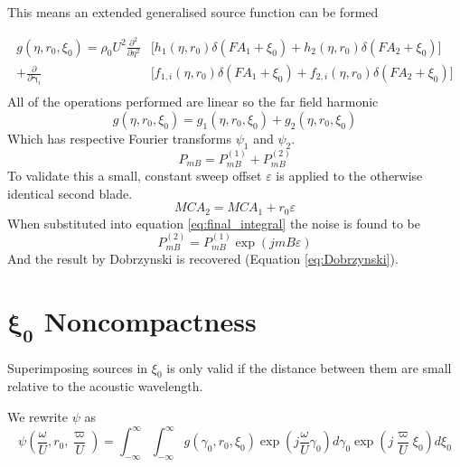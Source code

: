 \documentclass[8pt]{article}
\begin{document}
This means an extended generalised source function can be formed

\begin{equation}
    \begin{aligned}
        g(\eta, r_0, \xi_0) = \rho_0 U^2 \frac{\partial^2 }{\partial \eta^2} &\bigg[ h_1(\eta, r_0)\delta(FA_1 + \xi_0) + h_2(\eta, r_0) \delta(FA_2 + \xi_0)\bigg] \\
        + \frac{\partial }{\partial \boldsymbol{\gamma}_i} &\Big[ f_{1,i}(\eta, r_0) \delta(FA_1 + \xi_0) + f_{2,i}(\eta, r_0) \delta(FA_2 + \xi_0)\Big] \\
    \end{aligned}
    \label{eq:generalised_source_extended}
\end{equation}
All of the operations performed are linear so the far field harmonic
\begin{equation}
    g(\eta, r_0, \xi_0) = g_1(\eta, r_0, \xi_0) + g_2(\eta, r_0, \xi_0)
\end{equation}
Which has respective Fourier transforms $\psi_1$ and $\psi_2$.
\begin{equation}
    P_{mB} = P^{(1)}_{mB} + P^{(2)}_{mB}
\end{equation}
To validate this a small, constant sweep offset $\varepsilon$ is applied to the otherwise identical second blade.
\begin{equation}
    MCA_2 = MCA_1 + r_0 \varepsilon
\end{equation}
When substituted into equation \ref{eq:final_integral} the noise is found to be
\begin{equation}
    P^{(2)}_{mB} = P^{(1)}_{mB} \exp ( j mB \varepsilon )
\end{equation}
And the result by Dobrzynski is recovered (Equation \ref{eq:Dobrzynski}).


\section{ $\boldsymbol{\xi_0}$ Noncompactness }

Superimposing sources in $\xi_0$ is only valid if the distance between them are small relative to the acoustic wavelength.

We rewrite $\psi$ as
\begin{equation}
    \psi \left(\frac{\omega}{U}, r_0, \frac{\varpi}{U}\right) = \int_{-\infty}^\infty \int_{-\infty}^\infty g(\gamma_0, r_0, \xi_0) \exp \left(j \frac{\omega}{U} \gamma_0 \right) d\gamma_0 \exp \left(j \frac{\varpi}{U} \xi_0 \right) d\xi_0
    \label{eq:doublefourier}
\end{equation}
\end{document}
